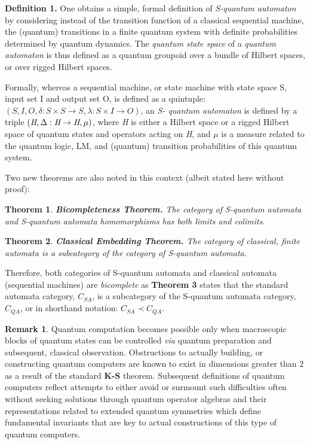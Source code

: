 \documentclass[12pt]{article}
\theoremstyle{plain}
\newtheorem{theorem}{Theorem}[section]
\theoremstyle{definition}
\newtheorem{remark}{Remark}[section]
\numberwithin{equation}{section}
\begin{document}
\textbf{Definition 1.}
One obtains a simple, formal definition of \emph{S-quantum automaton} by considering instead of the transition function of a classical sequential machine, the (quantum) transitions in a finite quantum system with definite probabilities determined by quantum dynamics. The \emph{quantum state space} of a \emph{quantum automaton} is thus defined as a quantum groupoid over a bundle of Hilbert spaces, or over rigged Hilbert spaces.

Formally, whereas a sequential machine, or state machine with state space S, input set I and output set O, is defined as a quintuple: $(S, I, O, \delta : S \times S \rightarrow S, \lambda: S \times I\rightarrow O)$, an \emph{S- quantum automaton} is defined by a triple $(\emph{H}, \Delta: \emph{H} \rightarrow \emph{H}, \mu)$, where \emph{H} is either a Hilbert space or a rigged Hilbert space of quantum states and operators acting on \emph{H}, and $\mu$ is a measure related to the quantum logic, LM, and (quantum) transition probabilities of this quantum system.
\bigbreak

Two new theorems are also noted in this context (albeit stated here without proof):

\begin{theorem} {\rm{\textbf{Bicompleteness Theorem.} }}
The category of S-quantum automata and S-quantum automata homomorphisms has both limits and colimits.
\end{theorem}

\begin{theorem} {\rm{\textbf{Classical Embedding Theorem.} }}
The category of  classical, finite automata is a subcategory of the  category of S-quantum automata.
\end{theorem}

Therefore, both categories of S-quantum automata and classical automata (sequential machines) are \emph{bicomplete}  as  \textbf{Theorem 3}  states that the standard automata category, $C_{SA}$,  is a subcategory of the S-quantum automata category, $C_{QA}$, or in shorthand notation: $C_{SA} \prec C_{QA}$.

\begin{remark}
Quantum computation becomes possible only when macroscopic blocks of quantum states can be controlled \emph{via} quantum preparation and subsequent, classical observation. Obstructions to actually building, or constructing quantum computers are known to exist in dimensions greater than $2$ as a result of the standard  \textbf{K-S} theorem. Subsequent definitions of quantum computers reflect attempts to either avoid or surmount such difficulties often without seeking solutions through quantum operator algebras and their representations related to extended quantum symmetries which define fundamental invariants that are key to actual constructions of this type of quantum computers.
\end{remark}
\end{document}
